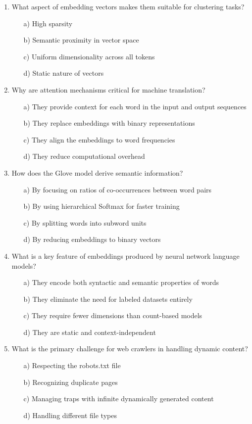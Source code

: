 \documentclass[8pt]{extarticle}
\begin{document}
\begin{multicols}{2}
\begin{enumerate}
\item What aspect of embedding vectors makes them suitable for clustering tasks?
\begin{itemize}
\item[a)] High sparsity
\item[b)] Semantic proximity in vector space
\item[c)] Uniform dimensionality across all tokens
\item[d)] Static nature of vectors
\end{itemize}

\item Why are attention mechanisms critical for machine translation?
\begin{itemize}
\item[a)] They provide context for each word in the input and output sequences
\item[b)] They replace embeddings with binary representations
\item[c)] They align the embeddings to word frequencies
\item[d)] They reduce computational overhead
\end{itemize}

\item How does the Glove model derive semantic information?
\begin{itemize}
\item[a)] By focusing on ratios of co-occurrences between word pairs
\item[b)] By using hierarchical Softmax for faster training
\item[c)] By splitting words into subword units
\item[d)] By reducing embeddings to binary vectors
\end{itemize}

\item What is a key feature of embeddings produced by neural network language models?
\begin{itemize}
\item[a)] They encode both syntactic and semantic properties of words
\item[b)] They eliminate the need for labeled datasets entirely
\item[c)] They require fewer dimensions than count-based models
\item[d)] They are static and context-independent
\end{itemize}


\item What is the primary challenge for web crawlers in handling dynamic content?
\begin{itemize}
\item[a)] Respecting the robots.txt file
\item[b)] Recognizing duplicate pages
\item[c)] Managing traps with infinite dynamically generated content
\item[d)] Handling different file types
\end{itemize}


\end{enumerate}
\end{multicols}
\end{document}
